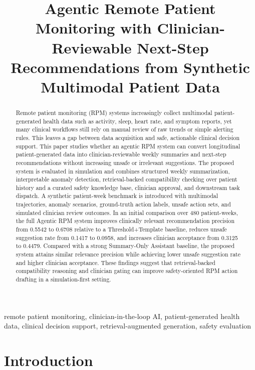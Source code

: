 \documentclass[conference]{IEEEtran}
\title{Agentic Remote Patient Monitoring with Clinician-Reviewable Next-Step Recommendations from Synthetic Multimodal Patient Data}
\author{
\IEEEauthorblockN{Author Name}
\IEEEauthorblockA{Institution\\
City, Country\\
email@example.com}
}
\begin{document}
\maketitle

\begin{abstract}
Remote patient monitoring (RPM) systems increasingly collect multimodal patient-generated health data such as activity, sleep, heart rate, and symptom reports, yet many clinical workflows still rely on manual review of raw trends or simple alerting rules. This leaves a gap between data acquisition and safe, actionable clinical decision support. This paper studies whether an agentic RPM system can convert longitudinal patient-generated data into clinician-reviewable weekly summaries and next-step recommendations without increasing unsafe or irrelevant suggestions. The proposed system is evaluated in simulation and combines structured weekly summarization, interpretable anomaly detection, retrieval-backed compatibility checking over patient history and a curated safety knowledge base, clinician approval, and downstream task dispatch. A synthetic patient-week benchmark is introduced with multimodal trajectories, anomaly scenarios, ground-truth action labels, unsafe action sets, and simulated clinician review outcomes. In an initial comparison over 480 patient-weeks, the full Agentic RPM system improves clinically relevant recommendation precision from 0.5542 to 0.6708 relative to a Threshold+Template baseline, reduces unsafe suggestion rate from 0.1417 to 0.0958, and increases clinician acceptance from 0.3125 to 0.4479. Compared with a strong Summary-Only Assistant baseline, the proposed system attains similar relevance precision while achieving lower unsafe suggestion rate and higher clinician acceptance. These findings suggest that retrieval-backed compatibility reasoning and clinician gating can improve safety-oriented RPM action drafting in a simulation-first setting.
\end{abstract}

\begin{IEEEkeywords}
remote patient monitoring, clinician-in-the-loop AI, patient-generated health data, clinical decision support, retrieval-augmented generation, safety evaluation
\end{IEEEkeywords}

\section{Introduction}
\end{document}
